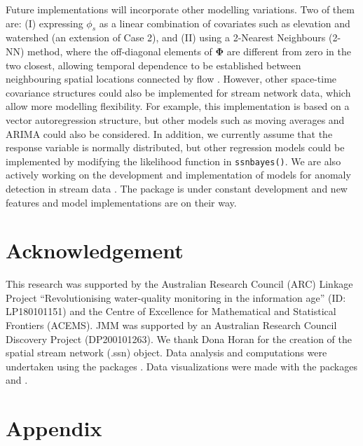 Future implementations will incorporate other modelling variations.
Two of them are: (I) expressing $\phi_s$ as a linear combination of covariates such as elevation and watershed (an extension of Case 2), and (II)
using a 2-Nearest Neighbours (2-NN) method, where the off-diagonal elements of $\pmb{\Phi}$ are different from zero in the two closest, allowing temporal dependence to be established between neighbouring spatial locations connected by flow \citep{santos2022bayesian}. 
However, other space-time covariance structures could also be implemented for stream network data, which allow more modelling flexibility. For example, this implementation is based on a vector autoregression structure, but other models such as moving averages and ARIMA could also be considered. In addition, we currently assume that the response variable is normally distributed, but other regression models could be implemented by modifying the likelihood function in \texttt{ssnbayes()}. 
We are also actively working on the development and implementation of models for anomaly detection in stream data \citep{santos2023unsupervised}.
The  package is under constant development and new features and model implementations are on their way. 





\section*{Acknowledgement}

This research was supported by the Australian Research Council (ARC) Linkage Project ``Revolutionising water-quality monitoring in the information age'' (ID: LP180101151) and the Centre of Excellence for Mathematical and Statistical Frontiers (ACEMS). 
JMM was supported by an Australian Research Council Discovery Project (DP200101263).
We thank Dona Horan for the creation of the spatial stream network (.ssn) object.
Data analysis and computations were undertaken using the packages  \citep{rstan}. Data visualizations were made with the packages  \citep{ggplot2} and  \citep{bayesplot}. 

\appendix
\section*{Appendix}
\label{sec:appndx} 






